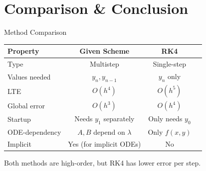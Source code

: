 \documentclass{beamer}
\begin{document}
\section{Comparison \& Conclusion}

\begin{frame}{Method Comparison}

\begin{center}
\begin{tabular}{lccc}
    \toprule
    \textbf{Property} & \textbf{Given Scheme} & \textbf{RK4} \\
    \midrule
    Type & Multistep & Single-step \\
    Values needed & $y_n, y_{n-1}$ & $y_n$ only \\
    LTE & $O(h^4)$ & $O(h^5)$ \\
    Global error & $O(h^3)$ & $O(h^4)$ \\
    Startup & Needs $y_1$ separately & Only needs $y_0$ \\
    ODE-dependency & $A, B$ depend on $\lambda$ & Only $f(x,y)$ \\
    Implicit & Yes (for implicit ODEs) & No \\
    \bottomrule
\end{tabular}
\end{center}

\vspace{0.3cm}
Both methods are high-order, but RK4 has lower error per step.

\end{frame}
\end{document}
